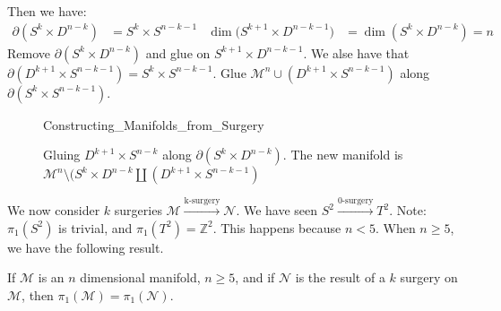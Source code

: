 \documentclass[crop=false,class=book,oneside]{standalone}
\begin{document}
            Then we have:
            \begin{align*}
                \partial(S^{k}\times {D^{n-k}})
                &=S^{k}\times{S^{n-k-1}}
                &
                \dim(S^{k+1}\times{D^{n-k-1})}
                &=\dim(S^{k}\times{D^{n-k}})=n
            \end{align*}
            Remove $\partial(S^{k}\times{D^{n-k}})$ and
            glue on $S^{k+1}\times{D}^{n-k-1}$.
            We alse have that
            $\partial(D^{k+1}\times{S^{n-k-1}})%
             =S^{k}\times{S^{n-k-1}}$.
            Glue $\mathcal{M}^{n}\cup(D^{k+1}\times S^{n-k-1})$
            along $\partial(S^{k}\times{S^{n-k-1}})$.
            \begin{figure}[H]
                \centering
                \captionsetup{type=figure}
                
                          {Constructing_Manifolds_from_Surgery}
                \caption[More Complicated Surgery Example.]
                        {Gluing $D^{k+1}\times S^{n-k}$ along
                         $\partial(S^{k}\times D^{n-k})$. The new
                         manifold is
                         $\mathcal{M}^{n}\setminus(S^{k}\times%
                          D^{n-k}\coprod(D^{k+1}\times S^{n-k-1})$}
                \label{fig:surgery_theory_glueing_S_k_D_n_k_to_M}
            \end{figure}
            We now consider $k$ surgeries
            $\mathcal{M}%
             \overset{\textrm{k-surgery}}{\longrightarrow}%
             \mathcal{N}$.
            We have seen
            $S^{2}%
             \overset{\textrm{0-surgery}}{\longrightarrow}
             T^{2}$.
            Note: $\pi_{1}(S^{2})$ is trivial,
            and $\pi_{1}(T^{2})=\mathbb{Z}^{2}$.
            This happens because $n<5$. When $n\geq{5}$,
            we have the following result.
            \begin{theorem}
                If $\mathcal{M}$ is an $n$ dimensional manifold,
                $n\geq{5}$, and if $\mathcal{N}$ is the result of
                a $k$ surgery on $\mathcal{M}$, then
                $\pi_{1}(\mathcal{M})=\pi_{1}(\mathcal{N})$.
            \end{theorem}
\end{document}
